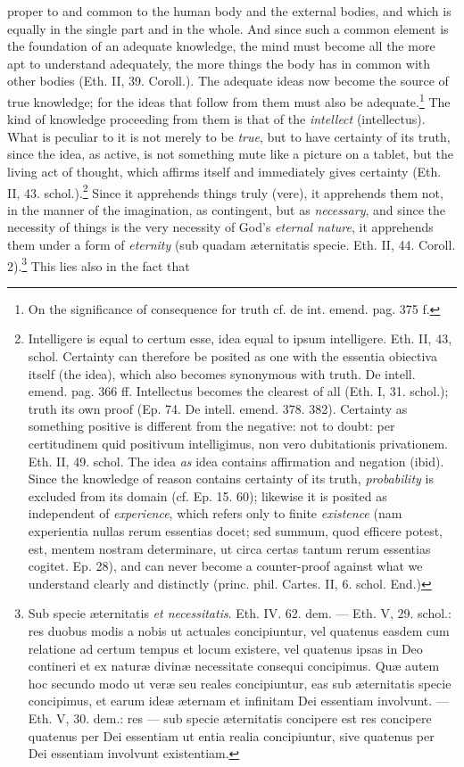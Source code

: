 \documentclass[12pt,a4paper,openany]{book}
\newcommand{\opage}[1]{\marginnote{\footnotesize\textit{[#1]}}}
\begin{document}
proper to and common to the human body and the
external bodies, and which is equally in the single part and in the
whole. And since such a common element is the foundation of an adequate
knowledge, the mind must become all the more apt
to understand adequately, the more things the body has in common %
with other bodies (Eth. II, 39. Coroll.). The adequate ideas
now become the source of true knowledge; for the ideas that
follow from them must also be adequate.\footnote{On
the significance of consequence for truth cf. de int. emend.
pag. 375 f.} The kind of knowledge proceeding from them is
that of the \emph{intellect} (intellectus). What is peculiar to it is not
merely to be \emph{true}, but to have certainty of its truth,
since the idea, as active, is not something mute like a picture on a
tablet, but the living act of thought, which affirms itself
and immediately gives certainty (Eth. II, 43.
\opage{93}\setcounter{footnote}{0}schol.).\footnote{Intelligere is equal to certum esse, idea equal to
ipsum intelligere. Eth. II, 43, schol. Certainty can therefore
be posited as one with the essentia obiectiva itself (the idea), which also
becomes synonymous with truth. De intell. emend. pag. 366 ff.
Intellectus becomes the clearest of all (Eth. I, 31. schol.);
truth its own proof (Ep. 74. De intell. emend. 378.
382). Certainty as something positive is different from the
negative: not to doubt: per certitudinem quid positivum
intelligimus, non vero dubitationis privationem. Eth. II, 49.
schol. The idea \emph{as} idea contains affirmation and negation
(ibid). Since the knowledge of reason contains certainty of its
truth, \emph{probability} is excluded from its domain (cf.
Ep. 15. 60); likewise it is posited as independent of
\emph{experience}, which refers only to finite
\emph{existence} (nam experientia nullas rerum essentias
docet; sed summum, quod efficere potest, est, mentem nostram
determinare, ut circa certas tantum rerum essentias cogitet.
Ep. 28), and can never become a counter-proof against what we understand
clearly and distinctly (princ. phil. Cartes. II, 6. schol.
End.)} Since it apprehends things truly (vere), it apprehends
them not, in the manner of the imagination, as contingent,
but as \emph{necessary}, and since the necessity of things is the very
necessity of God's \emph{eternal nature}, it apprehends them under a
form of \emph{eternity} (sub quadam æternitatis specie. Eth. II, 44.
Coroll. 2).\footnote{Sub specie æternitatis \emph{et
necessitatis}. Eth. IV. 62. dem. --- Eth. V, 29. schol.:
res duobus modis a nobis ut actuales concipiuntur, vel
quatenus easdem cum relatione ad certum tempus et locum
existere, vel quatenus ipsas in Deo contineri et ex naturæ
divinæ necessitate consequi concipimus. Quæ autem hoc secundo
modo ut veræ seu reales concipiuntur, eas sub æternitatis
specie concipimus, et earum ideæ æternam et infinitam Dei
essentiam involvunt. --- Eth. V, 30. dem.: res --- sub specie
æternitatis concipere est res concipere quatenus per Dei
essentiam ut entia realia concipiuntur, sive quatenus per Dei
essentiam involvunt existentiam.} This lies also in the fact that
\end{document}
